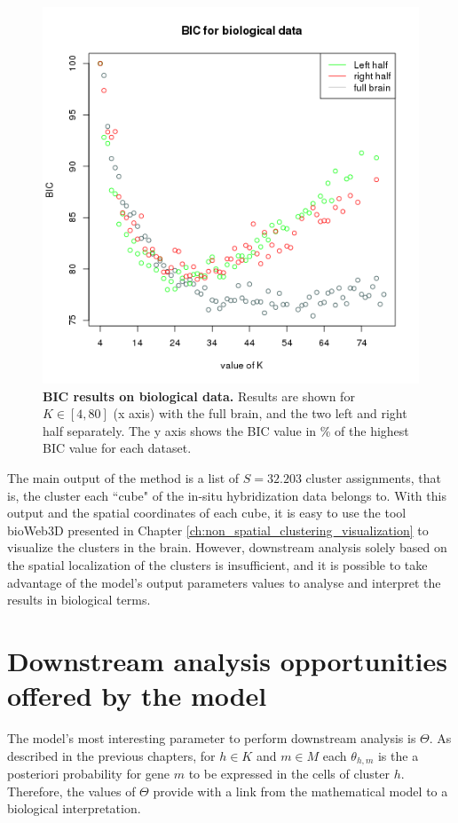 	\begin{figure}[h]
\centerline{\includegraphics[width=0.8\linewidth]{gfx/chapter6/real_BIC.png}}
\caption{{\bf BIC results on biological data.} Results are shown for $K \in [4,80]$ (x axis) with the full brain, and the two left and right half separately. The y axis shows the BIC value in \% of the highest BIC value for each dataset.}
\label{fig:realBIC}
	\end{figure} 
	
	
	The main output of the method is a list of $S=32.203$ cluster assignments, that is, the cluster each ``cube" of the in-situ hybridization data belongs to. With this output and the spatial coordinates of each cube, it is easy to use the tool bioWeb3D presented in Chapter \ref{ch:non_spatial_clustering_visualization} to visualize the clusters in the brain. However, downstream analysis solely based on the spatial localization of the clusters is insufficient, and it is possible to take advantage of the model's output parameters values to analyse and interpret the results in biological terms.

	\section{Downstream analysis opportunities offered by the model}
	The model's most interesting parameter to perform downstream analysis is $\Theta$. As described in the previous chapters,  for $h \in K$ and $m \in M$ each $\theta_{h,m}$ is the a posteriori probability for gene $m$ to be expressed in the cells of cluster $h$. Therefore, the values of $\Theta$ provide with a link from the mathematical model to a biological interpretation.\\
	
